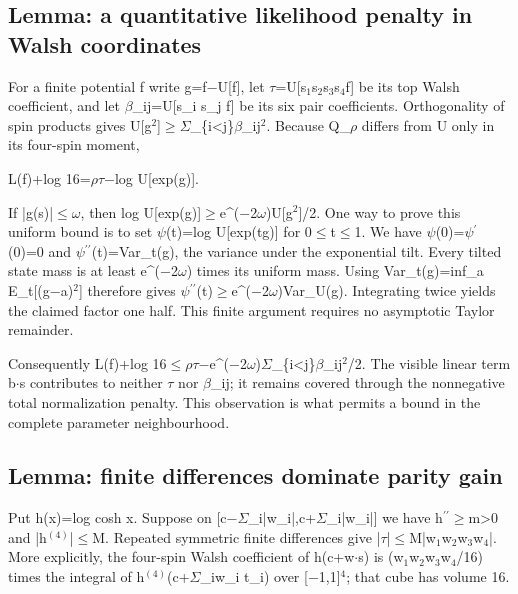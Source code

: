 \documentclass[11pt,a4paper]{article}
\begin{document}
\subsection{Lemma: a quantitative likelihood penalty in Walsh coordinates}
For a finite potential f write g=f\ensuremath{-}U[f], let \ensuremath{\tau}=U[s\ensuremath{_1}s\ensuremath{_2}s\ensuremath{_3}s\ensuremath{_4}f] be its top Walsh coefficient, and let \ensuremath{\beta}\_ij=U[s\_i s\_j f] be its six pair coefficients. Orthogonality of spin products gives U[g\ensuremath{^2}]\ensuremath{\geq}\ensuremath{\Sigma}\_\{i<j\}\ensuremath{\beta}\_ij\ensuremath{^2}. Because Q\_\ensuremath{\rho} differs from U only in its four-spin moment,

L(f)+log 16=\ensuremath{\rho}\ensuremath{\tau}\ensuremath{-}log U[exp(g)].

If |g(s)|\ensuremath{\leq}\ensuremath{\omega}, then log U[exp(g)]\ensuremath{\geq}e\textasciicircum{}(\ensuremath{-}2\ensuremath{\omega})U[g\ensuremath{^2}]/2. One way to prove this uniform bound is to set \ensuremath{\psi}(t)=log U[exp(tg)] for 0\ensuremath{\leq}t\ensuremath{\leq}1. We have \ensuremath{\psi}(0)=\ensuremath{\psi}\ensuremath{^{\prime}}(0)=0 and \ensuremath{\psi}\ensuremath{^{\prime\prime}}(t)=Var\_t(g), the variance under the exponential tilt. Every tilted state mass is at least e\textasciicircum{}(\ensuremath{-}2\ensuremath{\omega}) times its uniform mass. Using Var\_t(g)=inf\_a E\_t[(g\ensuremath{-}a)\ensuremath{^2}] therefore gives \ensuremath{\psi}\ensuremath{^{\prime\prime}}(t)\ensuremath{\geq}e\textasciicircum{}(\ensuremath{-}2\ensuremath{\omega})Var\_U(g). Integrating twice yields the claimed factor one half. This finite argument requires no asymptotic Taylor remainder.

Consequently L(f)+log 16\ensuremath{\leq}\ensuremath{\rho}\ensuremath{\tau}\ensuremath{-}e\textasciicircum{}(\ensuremath{-}2\ensuremath{\omega})\ensuremath{\Sigma}\_\{i<j\}\ensuremath{\beta}\_ij\ensuremath{^2}/2. The visible linear term b\ensuremath{\cdot}s contributes to neither \ensuremath{\tau} nor \ensuremath{\beta}\_ij; it remains covered through the nonnegative total normalization penalty. This observation is what permits a bound in the complete parameter neighbourhood.

\subsection{Lemma: finite differences dominate parity gain}
Put h(x)=log cosh x. Suppose on [c\ensuremath{-}\ensuremath{\Sigma}\_i|w\_i|,c+\ensuremath{\Sigma}\_i|w\_i|] we have h\ensuremath{^{\prime\prime}}\ensuremath{\geq}m>0 and |h\ensuremath{^{(4)}}|\ensuremath{\leq}M. Repeated symmetric finite differences give |\ensuremath{\tau}|\ensuremath{\leq}M|w\ensuremath{_1}w\ensuremath{_2}w\ensuremath{_3}w\ensuremath{_4}|. More explicitly, the four-spin Walsh coefficient of h(c+w\ensuremath{\cdot}s) is (w\ensuremath{_1}w\ensuremath{_2}w\ensuremath{_3}w\ensuremath{_4}/16) times the integral of h\ensuremath{^{(4)}}(c+\ensuremath{\Sigma}\_iw\_i t\_i) over [\ensuremath{-}1,1]\ensuremath{^4}; that cube has volume 16.
\end{document}

